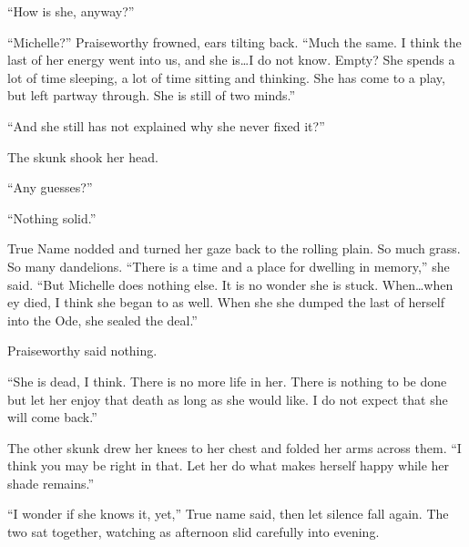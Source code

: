 ``How is she, anyway?''

``Michelle?'' Praiseworthy frowned, ears tilting back. ``Much the same. I think the last of her energy went into us, and she is\ldots I do not know. Empty? She spends a lot of time sleeping, a lot of time sitting and thinking. She has come to a play, but left partway through. She is still of two minds.''

``And she still has not explained why she never fixed it?''

The skunk shook her head.

``Any guesses?''

``Nothing solid.''

True Name nodded and turned her gaze back to the rolling plain. So much grass. So many dandelions. ``There is a time and a place for dwelling in memory,'' she said. ``But Michelle does nothing else. It is no wonder she is stuck. When\ldots when ey died, I think she began to as well. When she she dumped the last of herself into the Ode, she sealed the deal.''

Praiseworthy said nothing.

``She is dead, I think. There is no more life in her. There is nothing to be done but let her enjoy that death as long as she would like. I do not expect that she will come back.''

The other skunk drew her knees to her chest and folded her arms across them. ``I think you may be right in that. Let her do what makes herself happy while her shade remains.''

``I wonder if she knows it, yet,'' True name said, then let silence fall again. The two sat together, watching as afternoon slid carefully into evening.
